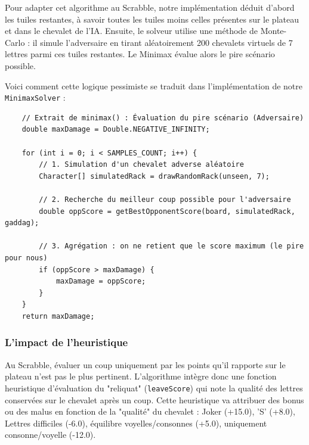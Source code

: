 \documentclass[a4paper]{article}
\begin{document}
    Pour adapter cet algorithme au Scrabble, notre implémentation déduit d'abord les tuiles restantes, à savoir toutes les tuiles moins celles présentes sur le plateau et dans le chevalet de l'IA. Ensuite, le solveur utilise une méthode de Monte-Carlo\cite{harrison2010introduction} : il simule l'adversaire en tirant aléatoirement 200 chevalets virtuels de 7 lettres parmi ces tuiles restantes. Le Minimax évalue alors le pire scénario possible.

    Voici comment cette logique pessimiste se traduit dans l'implémentation de notre \texttt{MinimaxSolver} :

    \begin{verbatim}
    // Extrait de minimax() : Évaluation du pire scénario (Adversaire)
    double maxDamage = Double.NEGATIVE_INFINITY;

    for (int i = 0; i < SAMPLES_COUNT; i++) {
        // 1. Simulation d'un chevalet adverse aléatoire
        Character[] simulatedRack = drawRandomRack(unseen, 7);

        // 2. Recherche du meilleur coup possible pour l'adversaire
        double oppScore = getBestOpponentScore(board, simulatedRack, gaddag);

        // 3. Agrégation : on ne retient que le score maximum (le pire pour nous)
        if (oppScore > maxDamage) {
            maxDamage = oppScore;
        }
    }
    return maxDamage;
    \end{verbatim}

    \newpage
    \subsubsection{L'impact de l'heuristique}
    Au Scrabble, évaluer un coup uniquement par les points qu'il rapporte sur le plateau n'est pas le plus pertinent. L'algorithme intègre donc une fonction heuristique d'évaluation du "reliquat" (\texttt{leaveScore}) qui note la qualité des lettres conservées sur le chevalet après un coup. Cette heuristique va attribuer des bonus ou des malus en fonction de la "qualité" du chevalet : Joker (+15.0), 'S' (+8.0), Lettres difficiles (-6.0), équilibre voyelles/consonnes (+5.0), uniquement consonne/voyelle (-12.0).
\end{document}
